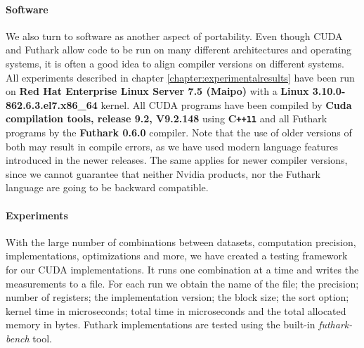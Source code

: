 \paragraph{Software}
We also turn to software as another aspect of portability. Even though CUDA and Futhark allow code to be run on many different architectures and operating systems, it is often a good idea to align compiler versions on different systems. All experiments described in chapter \ref{chapter:experimentalresults} have been run on \textbf{Red Hat Enterprise Linux Server 7.5 (Maipo)} with a \textbf{Linux 3.10.0-862.6.3.el7.x86\_64} kernel. All CUDA programs have been compiled by \textbf{Cuda compilation tools, release 9.2, V9.2.148} using \textbf{C\texttt{++11}} and all Futhark programs by the \textbf{Futhark 0.6.0} compiler. Note that the use of older versions of both may result in compile errors, as we have used modern language features introduced in the newer releases. The same applies for newer compiler versions, since we cannot guarantee that neither Nvidia products, nor the Futhark language are going to be backward compatible.

\paragraph{Experiments}
With the large number of combinations between datasets, computation precision, implementations, optimizations and more, we have created a testing framework for our CUDA implementations. It runs one combination at a time and writes the measurements to a file. For each run we obtain the name of the file; the precision; number of registers; the implementation version; the block size; the sort option; kernel time in microseconds; total time in microseconds and the total allocated memory in bytes. Futhark implementations are tested using the built-in \textit{futhark-bench} tool.

